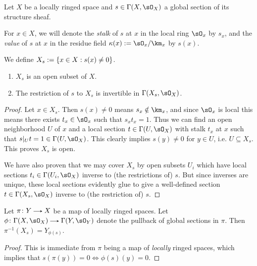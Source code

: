 \begin{nothing}
  \label{global-section}
  Let $X$ be a locally ringed space and $s \in \Gamma(X,\sO_X)$ a global section of its structure sheaf.
  
  \begin{subnotation*}
    For $x \in X$, we will denote the \emph{stalk} of $s$ at $x$ in the local ring $\sO_x$ by $s_x$, and the \emph{value} of $s$ at $x$ in the residue field $\kappa(x) \ce \sO_x/\km_x$ by $s(x)$.
  \end{subnotation*}

  \begin{subnotation*}
    We define $X_s \mathrel{:=} \{x \in X : s(x) \ne 0\}$.
  \end{subnotation*}
  
  \begin{sublemma}
    \label{global-section-nonvanishing-locus}
    \begin{enumerate}[leftmargin=*]
    \item \label{global-section-nonvanishing-locus-open} $X_s$ is an open subset of $X$.
    \item \label{global-section-nonvanishing-locus-invertible} The restriction of $s$ to $X_s$ is invertible in $\Gamma(X_s,\sO_X)$.
    \end{enumerate}
  \end{sublemma}

  \begin{proof}
    Let $x \in X_s$. Then $s(x) \ne 0$ means $s_x \notin \km_x$, and since $\sO_x$ is local this means there exists $t_x \in \sO_x$ such that $s_xt_x = 1$. Thus we can find an open neighborhood $U$ of $x$ and a local section $t \in \Gamma(U,\sO_X)$ with stalk $t_x$ at $x$ such that $s|_Ut = 1 \in \Gamma(U,\sO_X)$. This clearly implies $s(y) \ne 0$ for $y \in U$, i.e. $U \subseteq X_s$. This proves $X_s$ is open.

    We have also proven that we may cover $X_s$ by open subsets $U_i$ which have local sections $t_i \in \Gamma(U_i,\sO_X)$ inverse to (the restrictions of) $s$. But since inverses are unique, these local sections evidently glue to give a well-defined section $t \in \Gamma(X_s,\sO_X)$ inverse to (the restriction of) $s$.
  \end{proof}

  \begin{sublemma}
    \label{global-section-nonvanishing-locus-pullback}
    Let $\pi \c Y \to X$ be a map of locally ringed spaces. Let $\phi \c \Gamma(X,\sO_X) \to \Gamma(Y,\sO_Y)$ denote the pullback of global sections in $\pi$. Then $\pi^{-1}(X_s) = Y_{\phi(s)}$.
  \end{sublemma}

  \begin{proof}
    This is immediate from $\pi$ being a map of \emph{locally} ringed spaces, which implies that $s(\pi(y)) = 0 \iff \phi(s)(y) = 0$.
  \end{proof}
\end{nothing}

